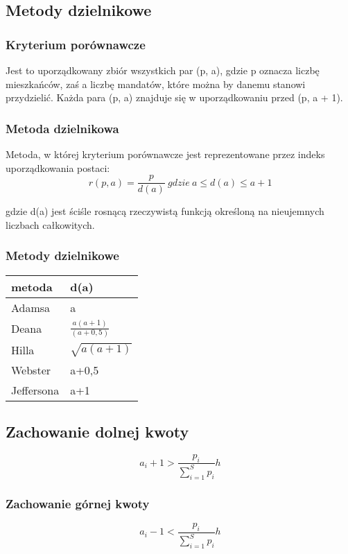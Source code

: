 \documentclass[12pt,a4paper]{article}
\begin{document}
\subsection{Metody dzielnikowe}
\subsubsection{Kryterium porównawcze}
Jest to uporządkowany zbiór wszystkich par (p, a), gdzie p oznacza liczbę mieszkańców, zaś a liczbę mandatów, które można by danemu stanowi przydzielić. Każda para (p, a) znajduje się w uporządkowaniu przed (p, a + 1).
\subsubsection{Metoda dzielnikowa}
Metoda, w której kryterium porównawcze jest reprezentowane przez indeks uporządkowania postaci:
\begin{equation}
r(p,a) = \frac{p}{d(a)} \  gdzie \  a\leqslant d(a)\leqslant a+1
\end{equation}

gdzie d(a) jest ściśle rosnącą rzeczywistą funkcją określoną na nieujemnych liczbach całkowitych.

\subsubsection{Metody dzielnikowe}
\begin{center}
    \begin{tabular}{ | l  |l |}
    \hline
    metoda  & d(a) \\ \hline
    Adamsa & a \\ \hline
    Deana&  $    \frac{a(a+1)}{(a+0,5)}$ \\ \hline
    Hilla & $\sqrt{a(a+1)}$\\ \hline
    Webster & a+0,5\\ \hline
    Jeffersona& a+1 \\ \hline
    
    \end{tabular}
\end{center}
\subsection{Zachowanie dolnej kwoty} 
\begin{equation}
a_i +1 > \frac{p_i}{\sum \limits_{i=1}^{S} p_i} h
\end{equation}

\subsubsection{Zachowanie górnej kwoty}
\begin{equation}
a_i -1 < \frac{p_i}{\sum \limits_{i=1}^{S} p_i} h
\end{equation}
\end{document}
